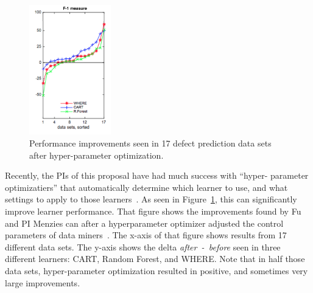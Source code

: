 \begin{figure}
    \includegraphics[width=1.4in]{figs/f1.png}  \caption{Performance improvements seen in 17 defect prediction data sets after   hyper-parameter optimization.}\label{fig:tuned}
\end{figure}Recently, the PIs of this proposal have had much success  with   ``hyper-
parameter optimizatiers'' that automatically determine which learner to use, and what settings to apply to those learners~\cite{fu2016tuning,chen2017riot,nair2017flash,agrawal2017better,agrawal2017better,fu2017revisiting,nair2017using,mathew2017shorter,nair2017faster,chen2017beyond,nair2016accidental,fu2016differential,chen2016sampling,agrawal2016wrong,agrawal2018better}.
As seen in  Figure~\ref{fig:tuned}, this can   significantly improve learner performance. That figure shows the  improvements found by Fu and PI Menzies
can after a hyperparameter optimizer adjusted the control
 parameters of data miners~\cite{fu2016tuning}. The x-axis of that figure shows results from 17 different data sets. The y-axis shows the delta 
\mbox{{\em after - before}} seen in three different
learners: CART, Random Forest, and WHERE.
Note that in half those data sets, hyper-parameter optimization
resulted in positive, and sometimes very large improvements.

